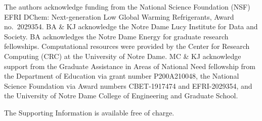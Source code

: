 \documentclass[journal=jacsat,manuscript=article]{achemso}
\begin{document}
\begin{acknowledgement}
The authors acknowledge funding from the National Science Foundation (NSF) EFRI DChem: Next-generation Low Global Warming Refrigerants, Award no.~2029354. BA \& KJ acknowledge the Notre Dame Lucy Institute for Data and Society. BA acknowledges the Notre Dame Energy for graduate research fellowships. Computational resources were provided by the Center for Research Computing (CRC) at the University of Notre Dame. MC \& KJ acknowledge support from the Graduate Assistance in Areas of National Need fellowship from the Department of Education via grant number P200A210048, the National Science Foundation via Award numbers CBET-1917474 and EFRI-2029354, and the University of Notre Dame College of Engineering and Graduate School.  

\end{acknowledgement}

\begin{suppinfo}
The Supporting Information is available free of charge.

\end{suppinfo}



\end{document}
